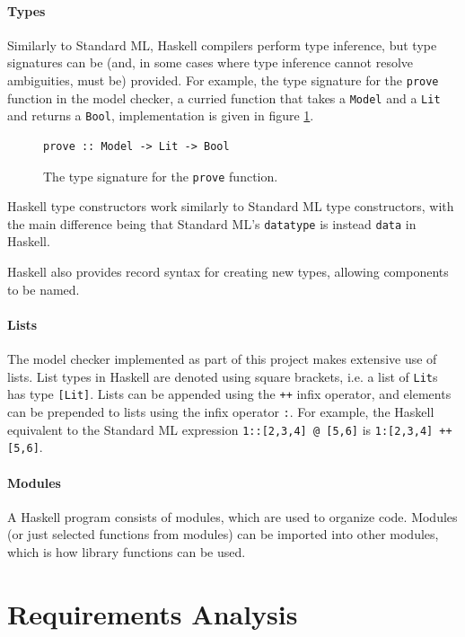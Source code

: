 \documentclass[12pt,a4paper,twoside,openright]{report}
\begin{document}
\paragraph{Types}{
Similarly to Standard ML, Haskell compilers perform type inference, but type
signatures can be (and, in some cases where type inference cannot resolve
ambiguities, must be) provided. For example, the type signature for the
\verb,prove, function in the model checker, a curried function
that takes a \verb,Model, and a \verb,Lit, and returns a \verb,Bool,,
implementation is given in figure \ref{typesigexample}.

\begin{figure}[!ht]
\begin{lstlisting}
prove :: Model -> Lit -> Bool
\end{lstlisting}
\caption{The type signature for the {\tt prove} function.}
\label{typesigexample}
\end{figure}

Haskell type constructors work similarly to Standard ML type constructors,
with the main difference being that Standard ML's \verb,datatype, is instead
\verb,data, in Haskell.

Haskell also provides record syntax for creating new types, allowing components
to be named.
}

\paragraph{Lists}{
The model checker implemented as part of this project makes extensive use
of lists. List types in Haskell are denoted using square brackets, i.e.
a list of \verb,Lit,s has type \verb,[Lit],.
Lists can be appended using the \verb,++, infix operator, and elements
can be prepended to lists using the infix operator \verb,:,. For
example, the Haskell equivalent to the Standard ML expression \verb.1::[2,3,4] @ [5,6].
is \verb.1:[2,3,4] ++ [5,6]..}

\paragraph{Modules}{
A Haskell program consists of modules, which are used to organize code.
Modules (or just selected functions from modules) can be imported into other
modules, which is how library functions can be used.
}

\section{Requirements Analysis}
\end{document}
